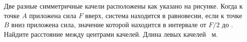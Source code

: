 Две разные симметричные качели расположены как указано на рисунке. Когда к точке $A$ приложена сила $F$ вверх, система находится в равновесии, если к точке $B$ вниз приложена сила, значение которой находится в интервале от $F/2$ до . Найдите расстояние между центрами качелей. Длина левых качелей ~м.